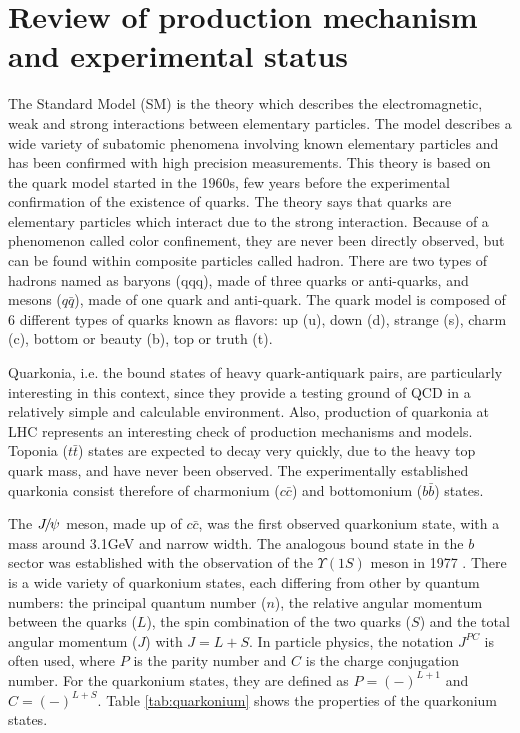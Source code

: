 \chapter[Review]{Review of production mechanism and experimental status}

The Standard Model (SM) is the theory which describes the electromagnetic, weak
and strong interactions between elementary particles. The model describes a
wide variety of subatomic phenomena involving known elementary particles and
has been confirmed with high precision measurements. This theory is based on
the quark model started in the 1960s\cite{GellMann:1964nj,Zweig:1981pd}, few
years before the experimental confirmation of the existence of quarks. The
theory says that quarks are elementary particles which interact due to the
strong interaction. Because of a phenomenon called color confinement, they are
never been directly observed,  but can be found within composite particles
called hadron. There are two types of hadrons named as baryons (qqq), made of
three quarks or anti-quarks, and mesons ($q\bar{q}$), made of one quark and
anti-quark. The quark model is composed of 6 different types of quarks known as
flavors: up (u), down (d), strange (s), charm (c), bottom or beauty (b), top or
truth (t).

Quarkonia, i.e. the bound states of heavy quark-antiquark pairs, are
particularly interesting in this context, since they provide a testing ground
of QCD in a relatively simple and calculable environment. Also, production of
quarkonia at LHC represents an interesting check of production mechanisms and
models. Toponia ($t\bar{t}$) states are expected to decay very quickly, due to
the heavy top quark mass, and have never been observed. The experimentally
established quarkonia consist therefore of charmonium ($c\bar{c}$) and
bottomonium ($b\bar{b}$) states.

The ${{J\mskip -3mu/\mskip -2mu\psi\mskip 2mu}}$ meson, made up of $c\bar{c}$, was the first observed quarkonium
state\cite{richter1974,ting1974}, with a mass around 3.1GeV and narrow width. The analogous 
bound state in the $b$ sector was established with the observation of the 
$\Upsilon(1S)$ meson in 1977 \cite{lederman1977}. 
There is a wide variety of quarkonium states, each differing from other by quantum
numbers: the principal quantum number ($n$), the relative angular momentum
between the quarks ($L$), the spin combination of the two quarks ($S$) and the total
angular momentum ($J$) with $J = L + S$. In particle physics, the notation $J^{PC}$ is
often used, where $P$ is the parity number and $C$ is the charge conjugation number.
For the quarkonium states, they are defined as $P=(-)^{L+1}$ and $C=(-)^{L+S}$.
Table \ref{tab:quarkonium} shows the properties of the quarkonium states. 

